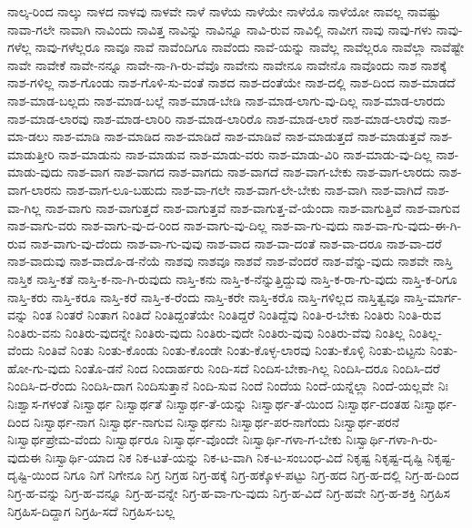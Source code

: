 {ನಾಲ್ಕ-ರಿಂದ
ನಾಲ್ಕು
ನಾಳದ
ನಾಳವು
ನಾಳವೇ
ನಾಳೆ
ನಾಳೆಯ
ನಾಳೆಯೇ
ನಾಳೆಯೊ
ನಾಳೆಯೋ
ನಾವಲ್ಲ
ನಾವಷ್ಟು
ನಾವಾ-ಗಲೇ
ನಾವಾಗಿ
ನಾವಿಂದು
ನಾವಿತ್ತ
ನಾವಿನ್ನು
ನಾವಿನ್ನೂ
ನಾವಿ-ರುವ
ನಾವಿಲ್ಲಿ
ನಾವೀಗ
ನಾವು
ನಾವು-ಗಳು
ನಾವು-ಗಳೆಲ್ಲ
ನಾವು-ಗಳೆಲ್ಲರೂ
ನಾವೂ
ನಾವೆ
ನಾವೆಂದಿಗೂ
ನಾವೆಂದು
ನಾವೆ-ಯನ್ನು
ನಾವೆಲ್ಲ
ನಾವೆಲ್ಲರೂ
ನಾವೆಲ್ಲಾ
ನಾವೆಷ್ಟೇ
ನಾವೇ
ನಾವೇಕೆ
ನಾವೇ-ನನ್ನೂ
ನಾವೇ-ನಾ-ಗಿ-ರು-ವೆವೊ
ನಾವೇನು
ನಾವೇನೂ
ನಾವೇನೊ
ನಾವೊಂದು
ನಾಶ
ನಾಶಕ್ಕೆ
ನಾಶ-ಗಳಿಲ್ಲ
ನಾಶ-ಗೊಂಡು
ನಾಶ-ಗೊಳಿ-ಸು-ವಂತೆ
ನಾಶದ
ನಾಶ-ದಂತೆಯೇ
ನಾಶ-ದಲ್ಲಿ
ನಾಶ-ದಿಂದ
ನಾಶ-ಮಾಡದೆ
ನಾಶ-ಮಾಡ-ಬಲ್ಲದು
ನಾಶ-ಮಾಡ-ಬಲ್ಲೆ
ನಾಶ-ಮಾಡ-ಬೇಡಿ
ನಾಶ-ಮಾಡ-ಲಾಗು-ವು-ದಿಲ್ಲ
ನಾಶ-ಮಾಡ-ಲಾರದು
ನಾಶ-ಮಾಡ-ಲಾರವು
ನಾಶ-ಮಾಡ-ಲಾರಿರಿ
ನಾಶ-ಮಾಡ-ಲಾರಿರೊ
ನಾಶ-ಮಾಡ-ಲಾರೆ
ನಾಶ-ಮಾಡ-ಲಾರೆವು
ನಾಶ-ಮಾ-ಡಲು
ನಾಶ-ಮಾಡಿ
ನಾಶ-ಮಾಡಿದ
ನಾಶ-ಮಾಡಿದೆ
ನಾಶ-ಮಾಡಿವೆ
ನಾಶ-ಮಾಡುತ್ತದೆ
ನಾಶ-ಮಾಡುತ್ತವೆ
ನಾಶ-ಮಾಡುತ್ತೀರಿ
ನಾಶ-ಮಾಡುನು
ನಾಶ-ಮಾಡುವ
ನಾಶ-ಮಾಡು-ವರು
ನಾಶ-ಮಾಡು-ವಿರಿ
ನಾಶ-ಮಾಡು-ವು-ದಿಲ್ಲ
ನಾಶ-ಮಾಡು-ವುದು
ನಾಶ-ವಾಗ
ನಾಶ-ವಾಗದ
ನಾಶ-ವಾಗದು
ನಾಶ-ವಾಗದೆ
ನಾಶ-ವಾಗ-ಬೇಕು
ನಾಶ-ವಾಗ-ಲಾರದು
ನಾಶ-ವಾಗ-ಲಾರನು
ನಾಶ-ವಾಗ-ಲೂ-ಬಹುದು
ನಾಶ-ವಾ-ಗಲೇ
ನಾಶ-ವಾಗ-ಲೇ-ಬೇಕು
ನಾಶ-ವಾಗಿ
ನಾಶ-ವಾಗಿದೆ
ನಾಶ-ವಾ-ಗಿಲ್ಲ
ನಾಶ-ವಾಗು
ನಾಶ-ವಾಗುತ್ತದೆ
ನಾಶ-ವಾಗುತ್ತವೆ
ನಾಶ-ವಾಗುತ್ತ-ವೆ-ಯೆಂದಾ
ನಾಶ-ವಾಗುತ್ತಿವೆ
ನಾಶ-ವಾಗುವ
ನಾಶ-ವಾಗು-ವರು
ನಾಶ-ವಾಗು-ವು-ದ-ರಿಂದ
ನಾಶ-ವಾಗು-ವು-ದಿಲ್ಲ
ನಾಶ-ವಾ-ಗು-ವುದು
ನಾಶ-ವಾ-ಗು-ವುದು-ಈ-ಗಿ-ರುವ
ನಾಶ-ವಾಗು-ವು-ದೆಂದು
ನಾಶ-ವಾ-ಗು-ವುವು
ನಾಶ-ವಾದ
ನಾಶ-ವಾ-ದಂತೆ
ನಾಶ-ವಾ-ದರೂ
ನಾಶ-ವಾ-ದರೆ
ನಾಶ-ವಾದುವು
ನಾಶ-ವಾದೊ-ಡ-ನೆಯೆ
ನಾಶವು
ನಾಶವೂ
ನಾಶವೆ
ನಾಶ-ವೆಂದರೆ
ನಾಶ-ವೆನ್ನು-ವುದು
ನಾಶವೇ
ನಾಸ್ತಿ
ನಾಸ್ತಿಕ
ನಾಸ್ತಿ-ಕತೆ
ನಾಸ್ತಿ-ಕ-ನಾ-ಗಿ-ರುವುದು
ನಾಸ್ತಿ-ಕನು
ನಾಸ್ತಿ-ಕ-ನೆನ್ನುತ್ತಿದ್ದುವು
ನಾಸ್ತಿ-ಕ-ರಾ-ಗು-ವುದು
ನಾಸ್ತಿ-ಕ-ರಿಗೂ
ನಾಸ್ತಿ-ಕರು
ನಾಸ್ತಿ-ಕರೂ
ನಾಸ್ತಿ-ಕರೆ
ನಾಸ್ತಿ-ಕ-ರೆಂದು
ನಾಸ್ತಿ-ಕರೇ
ನಾಸ್ತಿ-ಕರೊ
ನಾಸ್ತಿ-ಗಳಿಲ್ಲದ
ನಾಸ್ತಿತ್ವವೂ
ನಾಸ್ತಿ-ಮಾರ್ಗ-ವನ್ನು
ನಿಂತ
ನಿಂತರೆ
ನಿಂತಾಗ
ನಿಂತಿದೆ
ನಿಂತಿದ್ದಂತೆಯೇ
ನಿಂತಿದ್ದರೆ
ನಿಂತಿದ್ದೆವು
ನಿಂತಿ-ರ-ಬೇಕು
ನಿಂತಿರು
ನಿಂತಿ-ರುವ
ನಿಂತಿರು-ವನು
ನಿಂತಿರು-ವುದನ್ನೇ
ನಿಂತಿರು-ವುದು
ನಿಂತಿರು-ವುದೇ
ನಿಂತಿರು-ವುವು
ನಿಂತಿರು-ವೆವು
ನಿಂತಿಲ್ಲ
ನಿಂತಿಲ್ಲ-ವೆಂದು
ನಿಂತಿವೆ
ನಿಂತು
ನಿಂತು-ಕೊಂಡು
ನಿಂತು-ಕೊಂಡೇ
ನಿಂತು-ಕೊಳ್ಳ-ಲಾರವು
ನಿಂತು-ಕೊಳ್ಳಿ
ನಿಂತು-ಬಿಟ್ಟನು
ನಿಂತು-ಹೋ-ಗು-ವುದು
ನಿಂತೊ-ಡನೆ
ನಿಂದ
ನಿಂದಾರ್ಹರು
ನಿಂದಿ-ಸದೆ
ನಿಂದಿಸ-ಬೇಕಾ-ಗಿಲ್ಲ
ನಿಂದಿಸಿ-ದರೂ
ನಿಂದಿಸಿ-ದರೆ
ನಿಂದಿಸಿ-ದ-ರೆಂದು
ನಿಂದಿಸಿ-ದಾಗ
ನಿಂದಿಸುತ್ತಾನೆ
ನಿಂದಿ-ಸುವ
ನಿಂದೆ
ನಿಂದೆಯ
ನಿಂದೆ-ಯನ್ನೆಲ್ಲಾ
ನಿಂದೆ-ಯಲ್ಲವೇ
ನಿಃ
ನಿಃಶ್ವಾಸ-ಗಳಂತೆ
ನಿಃಸ್ವಾರ್ಥ
ನಿಃಸ್ವಾರ್ಥತೆ
ನಿಃಸ್ವಾರ್ಥ-ತೆ-ಯನ್ನು
ನಿಃಸ್ವಾರ್ಥ-ತೆ-ಯಿಂದ
ನಿಃಸ್ವಾರ್ಥ-ದಂತಹ
ನಿಃಸ್ವಾರ್ಥ-ದಿಂದ
ನಿಃಸ್ವಾರ್ಥ-ನಾಗ
ನಿಃಸ್ವಾರ್ಥ-ನಾಗುವ
ನಿಃಸ್ವಾರ್ಥನು
ನಿಃಸ್ವಾರ್ಥ-ಪರ-ನಾಗೆಂದು
ನಿಃಸ್ವಾರ್ಥ-ಪರನೆ
ನಿಃಸ್ವಾರ್ಥಪ್ರೇಮ-ವೆಂದು
ನಿಃಸ್ವಾರ್ಥರೂ
ನಿಃಸ್ವಾರ್ಥ-ವೊಂದೇ
ನಿಃಸ್ವಾರ್ಥಿ-ಗಳಾ-ಗ-ಬೇಕು
ನಿಃಸ್ವಾರ್ಥಿ-ಗಳಾ-ಗಿ-ರು-ವುದುಈ
ನಿಃಸ್ವಾರ್ಥಿ-ಯಾದ
ನಿಕ
ನಿಕ-ಟತೆ-ಯನ್ನು
ನಿಕ-ಟ-ವಾಗಿ
ನಿಕ-ಟ-ಸಂಬಂಧ-ವಿದೆ
ನಿಕೃಷ್ಟ
ನಿಕೃಷ್ಟ-ದೃಷ್ಟಿ
ನಿಕೃಷ್ಟ-ದೃಷ್ಟಿ-ಯಿಂದ
ನಿಗೂ
ನಿಗೆ
ನಿಗೇನೂ
ನಿಗ್ರ
ನಿಗ್ರಹ
ನಿಗ್ರ-ಹಕ್ಕೆ
ನಿಗ್ರ-ಹಕ್ಕೊಳ-ಪಟ್ಟು
ನಿಗ್ರ-ಹದ
ನಿಗ್ರ-ಹ-ದಲ್ಲಿ
ನಿಗ್ರ-ಹ-ದಿಂದ
ನಿಗ್ರ-ಹ-ವನ್ನು
ನಿಗ್ರ-ಹ-ವನ್ನೂ
ನಿಗ್ರ-ಹ-ವನ್ನೇ
ನಿಗ್ರ-ಹ-ವಾ-ಗು-ವುದು
ನಿಗ್ರ-ಹ-ವಿದೆ
ನಿಗ್ರ-ಹವೇ
ನಿಗ್ರ-ಹ-ಶಕ್ತಿ
ನಿಗ್ರಹಿಸ
ನಿಗ್ರಹಿಸ-ದಿದ್ದಾಗ
ನಿಗ್ರಹಿ-ಸದೆ
ನಿಗ್ರಹಿಸ-ಬಲ್ಲ
}
